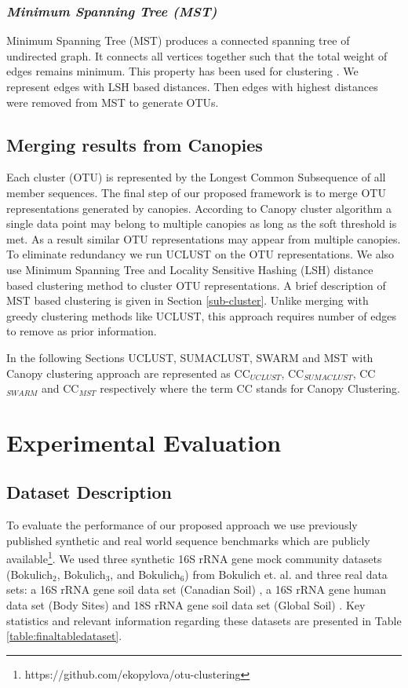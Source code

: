 \documentclass[10pt, conference, compsocconf]{IEEEtran}
\begin{document}
\subsubsection{\textit{Minimum Spanning Tree (MST)}}
 Minimum Spanning Tree (MST) produces a connected spanning tree of undirected graph. It connects all vertices together such that the total weight of edges remains minimum. This property has been used for clustering \cite{MARMstCluster} \cite{MARMstClustering2}. We represent edges with LSH based distances. Then edges with highest distances were removed from MST to generate OTUs.

\subsection{\textbf{Merging results from Canopies}}

Each cluster (OTU) is represented by the Longest Common Subsequence of all member sequences. The final step of our proposed framework is to merge OTU representations generated by canopies. According to Canopy cluster algorithm a single data point may belong to multiple canopies as long as the soft threshold is met. As a result similar OTU representations may appear from multiple canopies. To eliminate redundancy we run UCLUST on the OTU representations. We also use Minimum Spanning Tree and Locality Sensitive Hashing (LSH) distance based clustering method to cluster OTU representations. A brief description of MST based clustering is given in Section \ref{sub-cluster}. Unlike merging with greedy clustering methods like UCLUST, this approach requires number of edges to remove as prior information.    
 
In the following Sections UCLUST, SUMACLUST, SWARM and MST with Canopy clustering approach are represented as CC$_{UCLUST}$, CC$_{SUMACLUST}$, CC$_{SWARM}$ and CC$_{MST}$ respectively where the term CC stands for Canopy Clustering. 

\section{Experimental Evaluation}
\label{sec:Experimental}

\subsection{\textbf{Dataset Description}}


To evaluate the performance of our proposed approach we use previously published synthetic and real world sequence benchmarks \cite{MARopenDeNovo} which are publicly available\footnote{https://github.com/ekopylova/otu-clustering}. We used three synthetic 16S rRNA gene mock community datasets (Bokulich$_2$, Bokulich$_3$, and Bokulich$_6$) from Bokulich et. al. \cite{MARmockDatasetRef} and three real data sets: a 16S rRNA gene soil data set (Canadian Soil) \cite{MARcanadianSoil}, a 16S rRNA gene human data set (Body Sites) \cite{MARbodySites} and 18S rRNA gene soil data set (Global Soil) \cite{MARglobalSoil}. Key statistics and relevant information regarding these datasets are presented in Table \ref{table:finaltabledataset}. 
\end{document}
